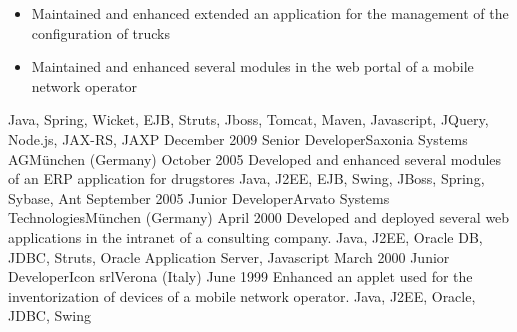 \begin{experiences}
{\begin{itemize}
                        \item Maintained and enhanced extended an application for the management of the configuration of trucks                 
                        \item Maintained and enhanced several modules in the web portal of a mobile network operator
                      \end{itemize}
                    }
                    {Java, Spring, Wicket, EJB, Struts, Jboss, Tomcat, Maven, Javascript, JQuery, Node.js, JAX-RS, JAXP}
  \emptySeparator
  \experience
  {December 2009}   {Senior Developer}{Saxonia Systems AG}{München (Germany)}
  {October 2005}    {
  					    Developed and enhanced several modules of an ERP application for drugstores
  					}   
                    {Java, J2EE, EJB, Swing, JBoss, Spring, Sybase, Ant}
  \emptySeparator
  \consultantexperience
  {September 2005}   {Junior Developer}{Arvato Systems Technologies}{München (Germany)}
  {April 2000}       {
                     	  Developed and deployed several web applications in the intranet of a consulting company.
                     }
                     {Java, J2EE, Oracle DB, JDBC, Struts, Oracle Application Server, Javascript}
  \emptySeparator
  \consultantexperience
  {March 2000}  	{Junior Developer}{Icon srl}{Verona (Italy)}
  {June 1999}   	{ 
  				 		Enhanced an applet used for the inventorization of devices of a mobile network operator.
  				 	}
                	{Java, J2EE, Oracle, JDBC, Swing} 
\end{experiences}


